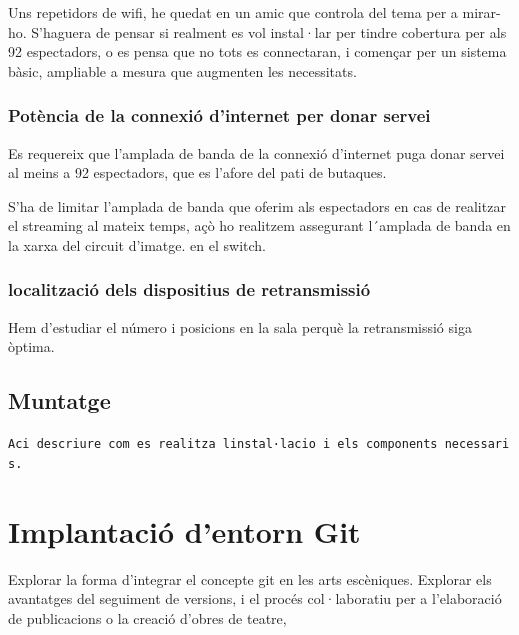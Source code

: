 \documentclass[
  10pt,
]{krantz}
\begin{document}
Uns repetidors de wifi, he quedat en un amic que controla del tema per a mirar-ho. S'haguera de pensar si realment es vol instal·lar per tindre cobertura per als 92 espectadors, o es pensa que no tots es connectaran, i començar per un sistema bàsic, ampliable a mesura que augmenten les necessitats.

\hypertarget{potuxe8ncia-de-la-connexiuxf3-dinternet-per-donar-servei}{%
\subsection{Potència de la connexió d'internet per donar servei}\label{potuxe8ncia-de-la-connexiuxf3-dinternet-per-donar-servei}}

Es requereix que l'amplada de banda de la connexió d'internet puga donar servei al meins a 92 espectadors, que es l'afore del pati de butaques.

S'ha de limitar l'amplada de banda que oferim als espectadors en cas de realitzar el streaming al mateix temps, açò ho realitzem assegurant l´amplada de banda en la xarxa del circuit d'imatge. en el switch.

\hypertarget{localitzaciuxf3-dels-dispositius-de-retransmissiuxf3}{%
\subsection{localització dels dispositius de retransmissió}\label{localitzaciuxf3-dels-dispositius-de-retransmissiuxf3}}

Hem d'estudiar el número i posicions en la sala perquè la retransmissió siga òptima.

\hypertarget{muntatge-1}{%
\section{Muntatge}\label{muntatge-1}}

\texttt{Aci\ descriure\ com\ es\ realitza\ l\textquotesingle{}instal·lacio\ i\ els\ components\ necessaris.}

\hypertarget{implantaciuxf3-dentorn-git}{%
\chapter{Implantació d'entorn Git}\label{implantaciuxf3-dentorn-git}}

Explorar la forma d'integrar el concepte git en les arts escèniques. Explorar els avantatges del seguiment de versions, i el procés col·laboratiu per a l'elaboració de publicacions o la creació d'obres de teatre,
\end{document}

